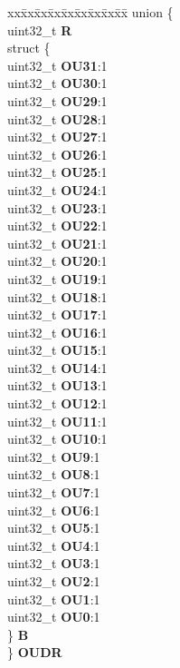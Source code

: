 \begin{DoxyCompactItemize}
\begin{tabbing}
\end{tabbing}\item 
\mbox{\label{structEMIOS__tag_ad2f5ce262bf9d673785d6215322ab6e9}} 
\begin{tabbing}
xx\=xx\=xx\=xx\=xx\=xx\=xx\=xx\=xx\=\kill
union \{\\
\>uint32\_t {\bfseries R}\\
\>struct \{\\
\>\>uint32\_t {\bfseries OU31}:1\\
\>\>uint32\_t {\bfseries OU30}:1\\
\>\>uint32\_t {\bfseries OU29}:1\\
\>\>uint32\_t {\bfseries OU28}:1\\
\>\>uint32\_t {\bfseries OU27}:1\\
\>\>uint32\_t {\bfseries OU26}:1\\
\>\>uint32\_t {\bfseries OU25}:1\\
\>\>uint32\_t {\bfseries OU24}:1\\
\>\>uint32\_t {\bfseries OU23}:1\\
\>\>uint32\_t {\bfseries OU22}:1\\
\>\>uint32\_t {\bfseries OU21}:1\\
\>\>uint32\_t {\bfseries OU20}:1\\
\>\>uint32\_t {\bfseries OU19}:1\\
\>\>uint32\_t {\bfseries OU18}:1\\
\>\>uint32\_t {\bfseries OU17}:1\\
\>\>uint32\_t {\bfseries OU16}:1\\
\>\>uint32\_t {\bfseries OU15}:1\\
\>\>uint32\_t {\bfseries OU14}:1\\
\>\>uint32\_t {\bfseries OU13}:1\\
\>\>uint32\_t {\bfseries OU12}:1\\
\>\>uint32\_t {\bfseries OU11}:1\\
\>\>uint32\_t {\bfseries OU10}:1\\
\>\>uint32\_t {\bfseries OU9}:1\\
\>\>uint32\_t {\bfseries OU8}:1\\
\>\>uint32\_t {\bfseries OU7}:1\\
\>\>uint32\_t {\bfseries OU6}:1\\
\>\>uint32\_t {\bfseries OU5}:1\\
\>\>uint32\_t {\bfseries OU4}:1\\
\>\>uint32\_t {\bfseries OU3}:1\\
\>\>uint32\_t {\bfseries OU2}:1\\
\>\>uint32\_t {\bfseries OU1}:1\\
\>\>uint32\_t {\bfseries OU0}:1\\
\>\} {\bfseries B}\\
\} {\bfseries OUDR}\\


\end{tabbing}
\end{DoxyCompactItemize}
